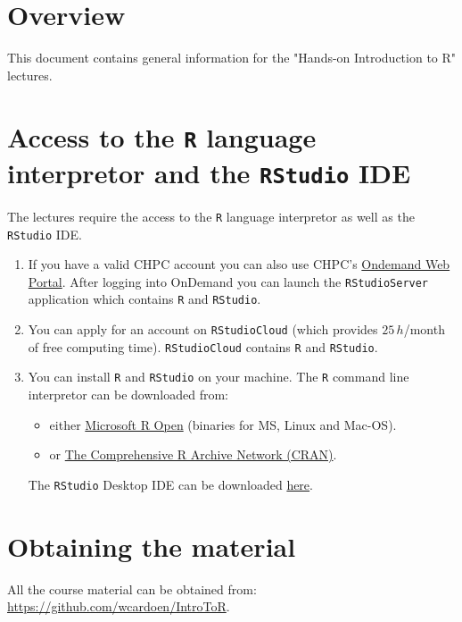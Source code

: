 \section*{Overview}

This document contains general information for the "Hands-on Introduction to R" lectures.\newline

\section{Access to the \texttt{R} language interpretor and the \texttt{RStudio} IDE}

The lectures require the access to the \texttt{R} language interpretor as well as the \texttt{RStudio} IDE.

\begin{enumerate}
\item If you have a valid CHPC account you can also use CHPC's \href{http://ondemand.chpc.utah.edu/}{Ondemand Web Portal}.\newline
      After logging into OnDemand you can launch the \texttt{RStudioServer} application which contains \texttt{R} and \texttt{RStudio}.

\item You can apply for an account on \texttt{RStudioCloud} (which provides $25\,h$/month of free computing time).\newline
      \texttt{RStudioCloud} contains \texttt{R} and \texttt{RStudio}. 

\item You can install \texttt{R} and \texttt{RStudio} on your machine.\newline
      The \texttt{R} command line interpretor can be downloaded from:
      \begin{itemize}
	      \item either \href{https://mran.microsoft.com/}{Microsoft R Open} (binaries for MS, Linux and Mac-OS).
  	 \item or \href{https://cran.r-project.org/}{The Comprehensive R Archive Network (CRAN)}.
      \end{itemize}			

      The \texttt{RStudio} Desktop IDE can be downloaded \href{https://www.rstudio.com/products/rstudio/download/}{here}.

\end{enumerate}



\section{Obtaining the material}
All the course material can be obtained from: \href{https://github.com/wcardoen/IntroToR}{https://github.com/wcardoen/IntroToR}.


